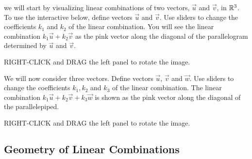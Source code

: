 \documentclass{ximera}
\begin{document}
\begin{exploration}\label{exp:linCombR3}
  we will start by visualizing linear combinations of two vectors, $\vec{u}$ and $\vec{v}$, in $\mathbb{R}^3$.
  To use the interactive below, define vectors $\vec{u}$ and $\vec{v}$.  Use sliders to change the coefficients $k_1$ and $k_2$ of the linear combination.  You will see the linear combination $k_1\vec{u}+k_2\vec{v}$ as the pink vector along the diagonal of the parallelogram determined by $\vec{u}$ and $\vec{v}$. 

  RIGHT-CLICK and DRAG the left panel to rotate the image.


\begin{onlineOnly}
\begin{center} 
\end{center}
\end{onlineOnly}

We will now consider three vectors. Define vectors $\vec{u}$, $\vec{v}$ and $\vec{w}$.  Use sliders to change the coefficients $k_1, k_2$ and $k_3$ of the linear combination.  The linear combination $k_1\vec{u}+k_2\vec{v}+k_3\vec{w}$ is shown as the pink vector along the diagonal of the parallelepiped. 

RIGHT-CLICK and DRAG the left panel to rotate the image.


\begin{onlineOnly}
\begin{center} 
\end{center}
\end{onlineOnly}
\end{exploration}

\subsection*{Geometry of Linear Combinations}
\end{document}
